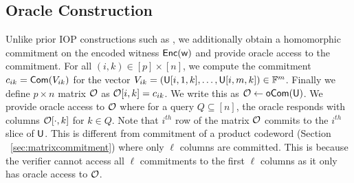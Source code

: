 \subsection{Oracle Construction}\label{sec:construct_oracle} 
Unlike prior IOP constructions such as \cite{ligero, aurora}, we additionally
obtain a homomorphic commitment on the encoded witness $\mathsf{Enc}(\mathsf{w})$ and provide
oracle access to the commitment. 
For all $(i,k)\in [p]\times
[n]$, we  compute the commitment %
$c_{ik}=\mathsf{Com}(V_{ik})$ for the vector 
$V_{ik}=(\mathsf{U}[i,1,k],\ldots,\mathsf{U}[i,m,k])\in \mathbb{F}^m$. 
Finally we define $p\times n$ matrix $\mathcal{O}$ as
$\mathcal{O}[i,k]=c_{ik}$. We write this as $\mathcal{O} \gets \mathsf{oCom}(\mathsf{U})$. We provide oracle access to $\mathcal{O}$ where for a
query $Q\subseteq [n]$, the oracle responds with columns $\mathcal{O}[\cdot,k]$ for
$k\in Q$. Note that $i^{th}$ row of the matrix $\mathcal{O}$ commits to the
$i^{th}$ slice of $\mathsf{U}$.   This is different from  commitment of a product codeword 
(Section ~\ref{sec:matrixcommitment})  where only 
$\ell$ columns are committed. This is
because the verifier cannot access all $\ell$ commitments to the first $\ell$ columns
as it only has oracle access to $\mathcal{O}$. 
\begin{comment}
\subsection{Well-formed Encodings}\label{sec:wellformedenc}
Let $\mc{W}$ denote the subset of $\mc{M}_{p,h,n}$
consisting of matrices $U$ such that $U[i,\cdot,\cdot]\in L_1\otimes L_2$ for all $i\in [p]$. 
We call an encoding $\ewit$ to be {\em well-formed} if $\ewit\in \mc{W}$. Note
that an encoding $\ewit\gets \enc(\wit)$ for any $\wit\in \FF^N$ is well formed. 
Let $\mc{W}_1$ denote the set of matrices
$U$ in $\mc{M}_{p,h,n}$ such that the $n$-length vector $U[i,j,\cdot]$ is a
codeword in $L_1$ for all $i,j$. Similarly let $\mc{W}_2$ denote the set of
matrices $U$ such that the $h$-length vector $U[i,\cdot,k]$ is a codeword in
$L_2$ for all $i,k$. It can be seen that $\mc{W}=\mc{W}_1\cap \mc{W}_2$. For $U^\ast\in \mc{M}_{p,h,n}$ define
$d(U^\ast,\mc{W}_i)=\min\{\Delta_i(U^\ast,U):U\in \mc{W}_i\}$ for $i=1,2$.
\end{comment}
